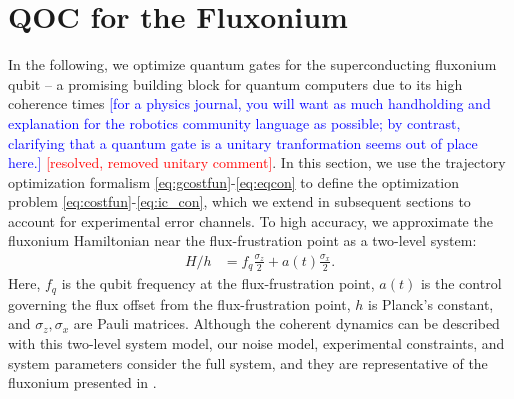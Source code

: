 \section{QOC for the Fluxonium \label{sec:fluxonium}}
In the following, we optimize quantum gates
for the superconducting fluxonium qubit -- a promising
building block for quantum computers due to its high
coherence times
\cite{earnest2018realization, lin2018demonstration,
  manucharyan2009fluxonium, nguyen2019high,
  zhang2020universal}
\textcolor{blue}{[for a physics journal, you will want as much handholding and explanation
    for the robotics community language as possible; by contrast, clarifying that
    a quantum gate is a unitary tranformation seems out of place here.]}
\textcolor{red}{[resolved, removed unitary comment]}.
In this section, we use the trajectory optimization
formalism \eqref{eq:gcostfun}-\eqref{eq:eqcon}
to define the optimization problem \eqref{eq:costfun}-\eqref{eq:ic_con},
which we extend in subsequent sections to account
for experimental error channels.
To high accuracy, we approximate the fluxonium Hamiltonian near the flux-frustration
point as a two-level system:
\begin{align}
  H/h &= f_{q} \frac{\sigma_{z}}{2} + a(t) \frac{\sigma_{x}}{2}.
  \label{eq:hamiltonian}
\end{align}
Here, $f_{q}$ is the qubit frequency at the flux-frustration point,
$a(t)$ is the control governing the flux offset from the flux-frustration point,
$h$ is Planck's constant, and $\sigma_{z}, \sigma_{x}$
are Pauli matrices. Although the coherent dynamics can be described with this two-level
system model, our noise model, experimental constraints, and system parameters
consider the full system, and they are representative of the fluxonium
presented in \cite{zhang2020universal}.


